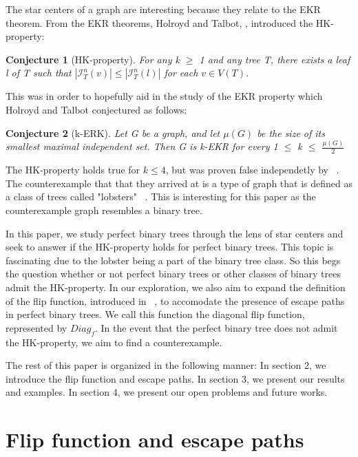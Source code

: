 \documentclass{amsart}
\newtheorem{conj}{Conjecture}[section]
\theoremstyle{definition}
\begin{document}
The star centers of a graph are interesting because they relate to the EKR theorem. From the EKR theorems, Holroyd and Talbot, \cite{MR2763040}, introduced the HK-property:

\begin{conj}[HK-property]
  For any k $\geq$ 1 and any tree T, there exists a leaf l of T such that $\left|\mathcal{I}^n_T(v)\right| \leq \left|\mathcal{I}^n_T(l)\right|$ for each $v \in V(T)$.
\end{conj}

This was in order to hopefully aid in the study of the EKR property which Holroyd and Talbot \cite{MR2136060} conjectured as follows:

\begin{conj}[k-ERK]
  Let G be a graph, and let $\mu(G)$ be the size of its smallest maximal independent set. Then G is k-EKR for every 1 $\leq$ k $\leq$ $\frac{\mu(G)}{2}$
\end{conj}

The HK-property holds true for $k \leq 4$, but was proven false independetly by ~\cite{MR3271819, MR3612439, MR2523796}. The counterexample that that they arrived at is a type of graph that is defined as a class of trees called "lobsters" ~\cite{MR4245360}. This is interesting for this paper as the counterexample graph resembles a binary tree.

In this paper, we study perfect binary trees through the lens of star centers and seek to answer if the HK-property holds for perfect binary trees. This topic is fascinating due to the lobster being a part of the binary tree class. So this begs the question whether or not perfect binary trees or other classes of binary trees admit the HK-property. In our exploration, we also aim to expand the definition of the flip function, introduced in ~\cite{MR2763040}, to accomodate the presence of escape paths in perfect binary trees. We call this function the diagonal flip function, represented by $Diag_{f}$. In the event that the perfect binary tree does not admit the HK-property, we aim to find a counterexample.

The rest of this paper is organized in the following manner:
In section 2, we introduce the flip function and escape paths. In section 3, we present our results and examples. In section 4, we present our open problems and future works.

\section{Flip function and escape paths}
\end{document}
